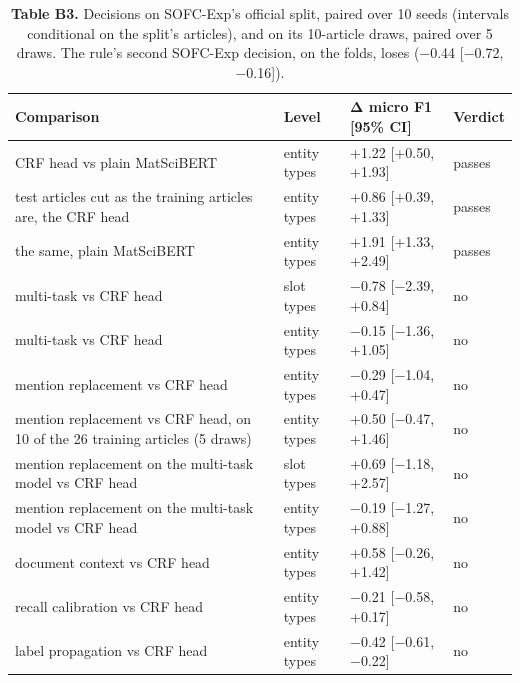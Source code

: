 \documentclass[11pt,a4paper]{article}
\begin{document}
\begin{table}[tp]
\centering\small\setlength{\tabcolsep}{3.5pt}
\begin{tabular}{>{\raggedright\arraybackslash}p{}>{\raggedright\arraybackslash}p{}>{\raggedright\arraybackslash}p{}>{\raggedright\arraybackslash}p{}}
\toprule
\textbf{Comparison} & \textbf{Level} & \textbf{Δ micro F1 {[}95\% CI{]}} & \textbf{Verdict} \\
\midrule
CRF head vs plain MatSciBERT & entity types & +1.22 {[}+0.50, +1.93{]} & passes \\
test articles cut as the training articles are, the CRF head & entity types & +0.86 {[}+0.39, +1.33{]} & passes \\
the same, plain MatSciBERT & entity types & +1.91 {[}+1.33, +2.49{]} & passes \\
multi-task vs CRF head & slot types & −0.78 {[}−2.39, +0.84{]} & no \\
multi-task vs CRF head & entity types & −0.15 {[}−1.36, +1.05{]} & no \\
mention replacement vs CRF head & entity types & −0.29 {[}−1.04, +0.47{]} & no \\
mention replacement vs CRF head, on 10 of the 26 training articles (5
draws) & entity types & +0.50 {[}−0.47, +1.46{]} & no \\
mention replacement on the multi-task model vs CRF head & slot types & +0.69 {[}−1.18, +2.57{]} & no \\
mention replacement on the multi-task model vs CRF head & entity types & −0.19 {[}−1.27, +0.88{]} & no \\
document context vs CRF head & entity types & +0.58 {[}−0.26, +1.42{]} & no \\
recall calibration vs CRF head & entity types & −0.21 {[}−0.58, +0.17{]} & no \\
label propagation vs CRF head & entity types & −0.42 {[}−0.61, −0.22{]} & no \\
\bottomrule
\end{tabular}
\caption*{\textbf{Table B3.} Decisions on SOFC-Exp's official split, paired over
10 seeds (intervals conditional on the split's articles), and on its
10-article draws, paired over 5 draws. The rule's second SOFC-Exp
decision, on the folds, loses (−0.44 {[}−0.72, −0.16{]}).}
\end{table}
\end{document}
